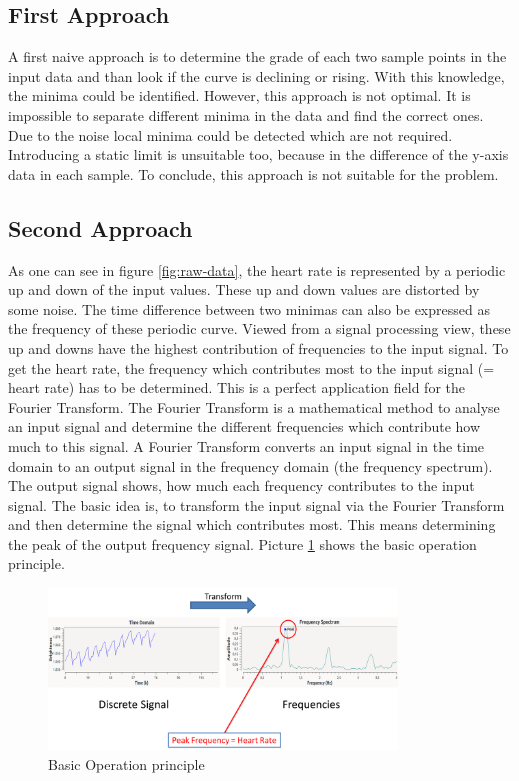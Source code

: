 \documentclass[notitlepage]{scrreprt}
\begin{document}
\subsection{First Approach}
A first naive approach is to determine the grade of each two sample points in the input data and than look if the curve is declining or rising. With this knowledge, the minima could be identified. However, this approach is not optimal. It is impossible to separate different minima in the data and find the correct ones. Due to the noise local minima could be detected which are not required. Introducing a static limit is unsuitable too, because in the difference of the y-axis data in each sample. To conclude, this approach is not suitable for the problem.

\subsection{Second Approach}
As one can see in figure \ref{fig:raw-data}, the heart rate is represented by a periodic up and down of the input values. These up and down values are distorted by some noise. The time difference between two minimas can also be expressed as the frequency of these periodic curve. Viewed from a signal processing view, these up and downs have the highest contribution of frequencies to the input signal. To get the heart rate, the frequency which contributes most to the input signal (= heart rate) has to be determined. This is a perfect application field for the Fourier Transform. The Fourier Transform is a mathematical method to analyse an input signal and determine the different frequencies which contribute how much to this signal. A Fourier Transform converts an input signal in the time domain to an output signal in the frequency domain (the frequency spectrum). The output signal shows, how much each frequency contributes to the input signal. The basic idea is, to transform the input signal via the Fourier Transform and then determine the signal which contributes most. This means determining the peak of the output frequency signal. Picture \ref{fig:basic-operation} shows the basic operation principle.

\begin{figure}[H]
	\centering
	\includegraphics[width=350px]{images/basicOperation.png}
	\caption{Basic Operation principle}
	\label{fig:basic-operation}
\end{figure}
\end{document}
